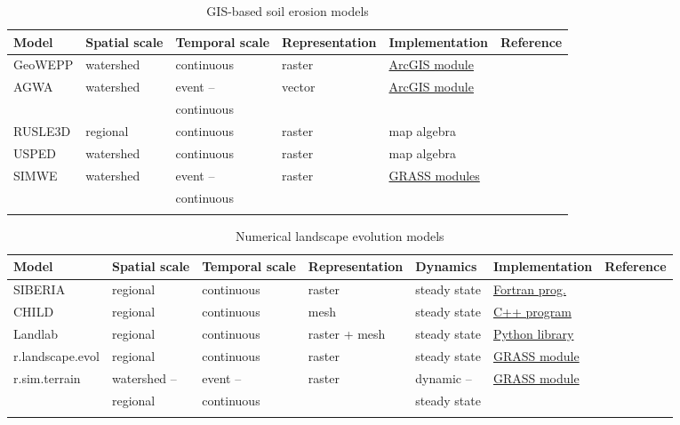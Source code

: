 \documentclass[esurf, manuscript]{copernicus}
\begin{document}
\begin{table}
\small
\caption{GIS-based soil erosion models}
\begin{tabu} to \textwidth {XXXXXl}
\toprule
Model & Spatial scale &  Temporal scale & Representation & Implementation & Reference\\
\midrule
GeoWEPP & watershed & continuous & raster & \href{http://geowepp.geog.buffalo.edu/}{ArcGIS module} & \citep{Flanagan2013}\\
AGWA  & watershed & event -- & vector & \href{https://www.tucson.ars.ag.gov/agwa/}{ArcGIS module} & \citep{Guertin2015}\\
&& continuous\\
RUSLE3D & regional & continuous & raster & map algebra & \citep{Mitasova1996}\\
USPED & watershed & continuous & raster & map algebra & \citep{Mitasova1996}\\
SIMWE & watershed & event -- & raster & \href{https://grass.osgeo.org/grass74/manuals/r.sim.sediment.html}{GRASS modules} & \citep{Mitas1998}\\
&& continuous\\
\bottomrule
\\
\end{tabu}
\label{table:erosion_models} 
\end{table}

\begin{table}
\small
\caption{Numerical landscape evolution models}
\begin{tabu} to \textwidth {XXXXXll}
\toprule
Model & Spatial scale &  Temporal scale & Representation & Dynamics & Implementation & Reference\\
\midrule
SIBERIA & regional & continuous & raster & steady state & \href{https://csdms.colorado.edu/wiki/Model:SIBERIA}{Fortran prog.} & \citep{Willgoose2005}\\
CHILD & regional & continuous & mesh & steady state & \href{https://csdms.colorado.edu/wiki/Model:CHILD}{C++ program} & \citep{Tucker2001}\\
Landlab & regional & continuous & raster + mesh & steady state & \href{https://github.com/landlab/}{Python library} & \citep{Hobley2017}\\
r.landscape.evol  & regional & continuous & raster &  steady state & \href{https://grass.osgeo.org/grass74/manuals/addons/r.landscape.evol.html}{GRASS module} & \citep{Barton2010}\\
r.sim.terrain & watershed -- & event -- & raster & dynamic -- & \href{https://github.com/baharmon/landscape_evolution}{GRASS module} &\\ %
& regional & continuous && steady state & &\\
\bottomrule
\\
\end{tabu}
\label{table:evolution_models} 
\end{table}
\end{document}
